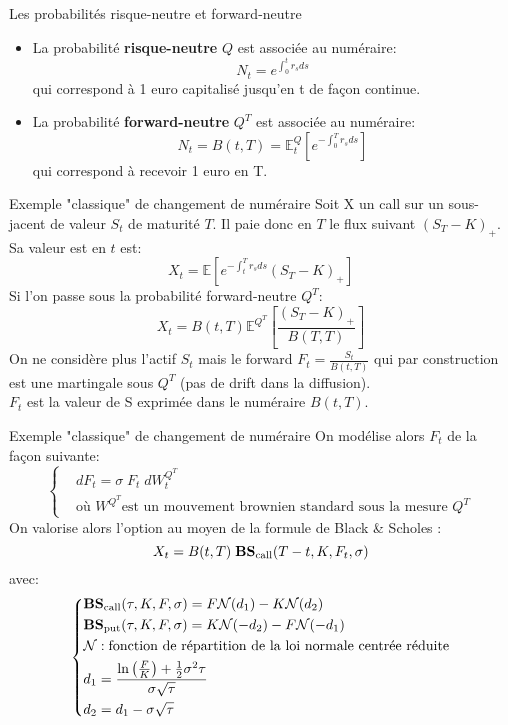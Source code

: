 \documentclass{beamer}
\begin{document}
\begin{frame}{Les probabilités risque-neutre et forward-neutre}
\begin{itemize}
\item La probabilité \textbf{risque-neutre} $Q$ est associée au numéraire:
\[
N_t=e^{\int_0^t r_s ds }
\]
qui correspond à 1 euro capitalisé jusqu'en t de façon continue.
\vspace{0.5cm}\\
\item La probabilité \textbf{forward-neutre} $Q^T$ est associée au numéraire:
\[
N_t=B(t,T)=\mathbb{E}^Q_t[e^{-\int_0^T r_s ds}]
\]
qui correspond à recevoir 1 euro en T.
\end{itemize}

\end{frame}

\begin{frame}{Exemple "classique" de changement de numéraire}
Soit X un call sur un sous-jacent de valeur $S_t$ de maturité $T$. Il paie donc en $T$ le flux suivant $(S_T-K)_+$.\\
Sa valeur est en $t$ est:
\[
X_t=\mathbb{E}[e^{-\int_t^T r_s ds}(S_T-K)_+]
\]
Si l'on passe sous la probabilité forward-neutre $Q^T$:
\[
X_t=B(t,T)\mathbb{E}^{Q^T}\left[\frac{(S_T-K)_+}{B(T,T)}\right]
\]
On ne considère plus l'actif $S_t$ mais le forward $F_t=\frac{S_t}{B(t,T)}$  qui par construction est une martingale sous $Q^T$ (pas de drift dans la diffusion).\\
$F_t$ est la valeur de S exprimée dans le numéraire $B(t,T)$.
\end{frame}
\begin{frame}{Exemple "classique" de changement de numéraire}
On modélise alors $F_t$ de la façon suivante:
\[
\left\{
\begin{split}
&dF_t=\sigma\; F_t \;dW_t^{Q^T}\\
&\text{où } W^{Q^T}\text{est un mouvement brownien standard sous la mesure }Q^T
\end{split}
\right.
\]
On valorise alors l'option au moyen de la formule de Black \& Scholes :
\[
X_t=B(t,T)\;\text{\textbf{BS}}_\text{call}(T-t,K,F_t,\sigma)
\]
avec:
\[
\left\{
\begin{split}
&\text{\textbf{BS}}_\text{call}(\tau,K,F,\sigma)=F\mathcal{N}(d_1)-K \mathcal{N}(d_2)\\
&\text{\textbf{BS}}_\text{put}(\tau,K,F,\sigma)=K\mathcal{N}(-d_2)-F \mathcal{N}(-d_1)\\
&\mathcal{N} : \text{fonction de répartition de la loi normale centrée réduite}\\
&d_1=\frac{\ln\left(\frac{F}{K}\right)+\frac{1}{2}\sigma^2\tau}{\sigma\sqrt{\tau}}\\
&d_2=d_1-\sigma\sqrt{\tau}
\end{split}
\right.
\]
\end{frame}
\end{document}
